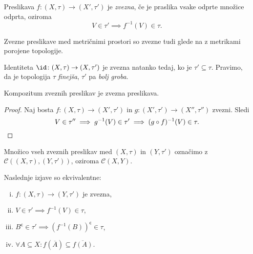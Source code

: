 
\begin{okvir}
\begin{definicija}
Preslikava $f \colon (X,\tau)\to(X',\tau')$ je
\emph{zvezna}, če je praslika vsake odprte
množice odprta, oziroma
\[
V\in\tau' \implies f^{-1}(V) \in \tau.
\]
\end{definicija}
\end{okvir}

\begin{opomba}
Zvezne preslikave med metričnimi prostori so zvezne tudi glede na z
metrikami porojene topologije.
\end{opomba}

\begin{opomba}
Identiteta $\id \colon (X,\tau) \to (X,\tau')$ je
zvezna natanko tedaj, ko je $\tau' \subseteq \tau$.
Pravimo, da je topologija $\tau$
\emph{finejša},
$\tau'$ pa
\emph{bolj groba}.
\end{opomba}

\begin{trditev}
Kompozitum zveznih preslikav je zvezna preslikava.
\end{trditev}

\begin{proof}
Naj bosta $f \colon (X,\tau) \to (X',\tau')$ in
$g \colon (X',\tau') \to (X'',\tau'')$ zvezni. Sledi
\[
V \in \tau'' \implies g^{-1}(V) \in \tau' \implies
(g \circ f)^{-1}(V) \in \tau. \qedhere
\]
\end{proof}

\begin{opomba}
Množico vseh zveznih preslikav med $(X,\tau)$ in
$(Y,\tau')$ označimo z $\mathcal{C}((X,\tau),
(Y,\tau'))$, oziroma $\mathcal{C}(X,Y)$.
\end{opomba}

\begin{izrek}\label{iz:1}
Naslednje izjave so ekvivalentne:

\begin{enumerate}[i)]
\item $f \colon (X,\tau) \to (Y,\tau')$ je zvezna,
\item $V \in \tau' \implies f^{-1}(V) \in \tau$,
\item $B^\mathsf{c} \in \tau' \implies
(f^{-1}(B))^\mathsf{c} \in \tau$,
\item $\forall A \subseteq X \colon f(\overline{A}) \subseteq
\overline{f(A)}$.
\end{enumerate}
\end{izrek}

